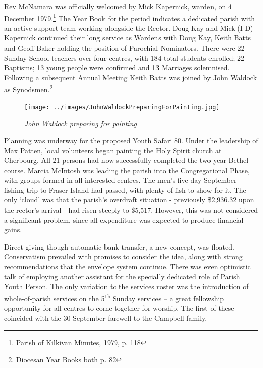 Rev McNamara was officially welcomed by Mick Kapernick, warden, on 4 December 1979.\footnote{Parish of Kilkivan Minutes, 1979, p. 118} The Year Book for the period indicates a dedicated parish with an active support team working alongside the Rector. Doug Kay and Mick (I D) Kapernick continued their long service as Wardens with Doug Kay, Keith Batts and Geoff Baker holding the position of Parochial Nominators. There were 22 Sunday School teachers over four centres, with 184 total students enrolled; 22 Baptisms; 13 young people were confirmed and 13 Marriages solemnised. Following a subsequent Annual Meeting Keith Batts was joined by John Waldock as Synodsmen.\footnote{Diocesan Year Books both p. 82}








\begin{figure}[!htb]
\begin{center}
\texttt{[image: ../images/JohnWaldockPreparingForPainting.jpg]}
\caption{\itshape John Waldock preparing for painting}
\end{center}
\end{figure}




Planning was underway for the proposed Youth Safari 80. Under the leadership of Max Patten, local volunteers began painting the Holy Spirit church at Cherbourg. All 21 persons had now successfully completed the two-year Bethel course. Marcia McIntosh was leading the parish into the Congregational Phase, with groups formed in all interested centres. The men's five-day September fishing trip to Fraser Island had passed, with plenty of fish to show for it. The only `cloud' was that the parish's overdraft situation - previously \$2,936.32 upon the rector's arrival - had risen steeply to \$5,517. However, this was not considered a significant problem, since all expenditure was expected to produce financial gains.



Direct giving though automatic bank transfer, a new concept, was floated. Conservatism prevailed with promises to consider the idea, along with strong recommendations that the envelope system continue. There was even optimistic talk of employing another assistant for the specially dedicated role of Parish Youth Person. The only variation to the services roster was the introduction of whole-of-parish services on the 5\textsuperscript{th} Sunday services -- a great fellowship opportunity for all centres to come together for worship. The first of these coincided with the 30 September farewell to the Campbell family.



